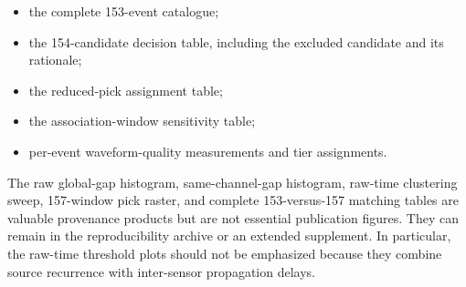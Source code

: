 \documentclass[11pt]{article}
\begin{document}
\begin{itemize}
\item the complete 153-event catalogue;
\item the 154-candidate decision table, including the excluded candidate and
its rationale;
\item the reduced-pick assignment table;
\item the association-window sensitivity table;
\item per-event waveform-quality measurements and tier assignments.
\end{itemize}

The raw global-gap histogram, same-channel-gap histogram, raw-time clustering
sweep, 157-window pick raster, and complete 153-versus-157 matching tables are
valuable provenance products but are not essential publication figures. They
can remain in the reproducibility archive or an extended supplement. In
particular, the raw-time threshold plots should not be emphasized because they
combine source recurrence with inter-sensor propagation delays.
\end{document}
